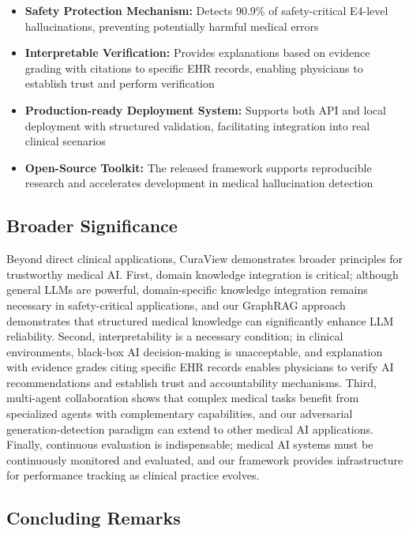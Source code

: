 \documentclass[11pt]{article}
\begin{document}
\begin{itemize}
\item
  \textbf{Safety Protection Mechanism:} Detects 90.9\% of safety-critical E4-level hallucinations, preventing potentially harmful medical errors
\item
  \textbf{Interpretable Verification:} Provides explanations based on evidence grading with citations to specific EHR records, enabling physicians to establish trust and perform verification
\item
  \textbf{Production-ready Deployment System:} Supports both API and local deployment with structured validation, facilitating integration into real clinical scenarios
\item
  \textbf{Open-Source Toolkit:} The released framework supports reproducible research and accelerates development in medical hallucination detection
\end{itemize}

\subsection{Broader Significance}

Beyond direct clinical applications, CuraView demonstrates broader principles for trustworthy medical AI. First, domain knowledge integration is critical; although general LLMs are powerful, domain-specific knowledge integration remains necessary in safety-critical applications, and our GraphRAG approach demonstrates that structured medical knowledge can significantly enhance LLM reliability. Second, interpretability is a necessary condition; in clinical environments, black-box AI decision-making is unacceptable, and explanation with evidence grades citing specific EHR records enables physicians to verify AI recommendations and establish trust and accountability mechanisms. Third, multi-agent collaboration shows that complex medical tasks benefit from specialized agents with complementary capabilities, and our adversarial generation-detection paradigm can extend to other medical AI applications. Finally, continuous evaluation is indispensable; medical AI systems must be continuously monitored and evaluated, and our framework provides infrastructure for performance tracking as clinical practice evolves.

\subsection{Concluding Remarks}
\end{document}
